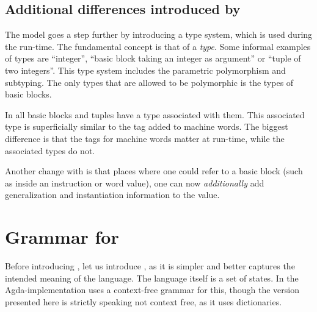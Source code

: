 \subsection{Additional differences introduced by \ATAL}

The \ATAL model goes a step further by introducing a type system, which is used
during the run-time. The fundamental concept is that of a \emph{type}. Some
informal examples of types are ``integer'', ``basic block taking an integer as
argument'' or ``tuple of two integers''. This type system includes the
parametric polymorphism and subtyping. The only types that are allowed to be
polymorphic is the types of basic blocks.

In \ATAL all basic blocks and tuples have a type associated with them. This
associated type is superficially similar to the tag added to machine words. The
biggest difference is that the tags for machine words matter at run-time, while
the associated types do not.

Another change with \ATAL is that places where one could refer to a basic block
(such as inside an instruction or word value), one can now \emph{additionally}
add generalization and instantiation information to the value.

\section{Grammar for \ATALe}

Before introducing \ATAL, let us introduce \ATALe, as it is simpler and better
captures the intended meaning of the language. The language itself is a set of
states. In the Agda-implementation uses a context-free grammar for this, though
the version presented here is strictly speaking not context free, as it uses
dictionaries.


